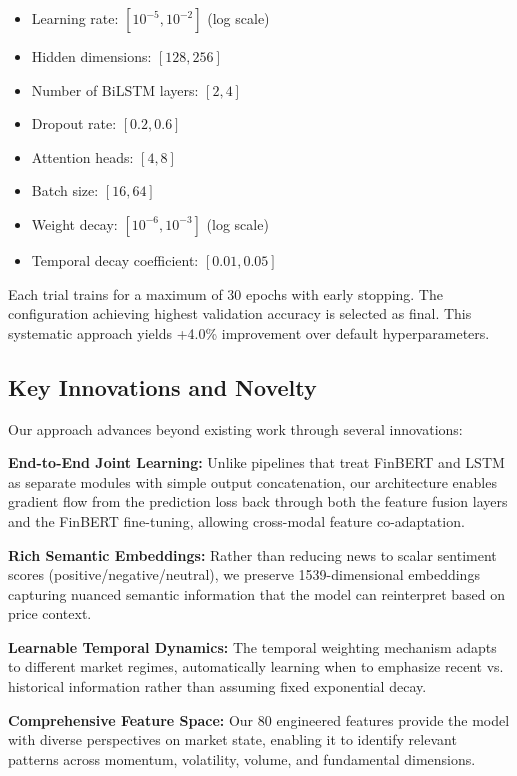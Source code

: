 \documentclass[conference]{IEEEtran}
\begin{document}
\begin{itemize}
\item Learning rate: $[10^{-5}, 10^{-2}]$ (log scale)
\item Hidden dimensions: $[128, 256]$
\item Number of BiLSTM layers: $[2, 4]$
\item Dropout rate: $[0.2, 0.6]$
\item Attention heads: $[4, 8]$
\item Batch size: $[16, 64]$
\item Weight decay: $[10^{-6}, 10^{-3}]$ (log scale)
\item Temporal decay coefficient: $[0.01, 0.05]$
\end{itemize}

Each trial trains for a maximum of 30 epochs with early stopping. The configuration achieving highest validation accuracy is selected as final. This systematic approach yields +4.0\% improvement over default hyperparameters.

\subsection{Key Innovations and Novelty}

Our approach advances beyond existing work through several innovations:

\textbf{End-to-End Joint Learning:} Unlike pipelines that treat FinBERT and LSTM as separate modules with simple output concatenation, our architecture enables gradient flow from the prediction loss back through both the feature fusion layers and the FinBERT fine-tuning, allowing cross-modal feature co-adaptation.

\textbf{Rich Semantic Embeddings:} Rather than reducing news to scalar sentiment scores (positive/negative/neutral), we preserve 1539-dimensional embeddings capturing nuanced semantic information that the model can reinterpret based on price context.

\textbf{Learnable Temporal Dynamics:} The temporal weighting mechanism adapts to different market regimes, automatically learning when to emphasize recent vs. historical information rather than assuming fixed exponential decay.

\textbf{Comprehensive Feature Space:} Our 80 engineered features provide the model with diverse perspectives on market state, enabling it to identify relevant patterns across momentum, volatility, volume, and fundamental dimensions.
\end{document}
